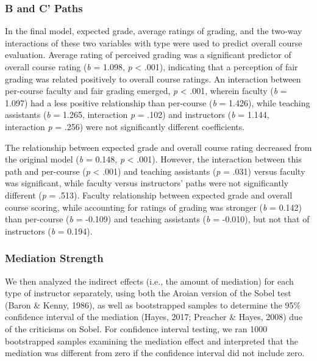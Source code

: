 \documentclass[,man]{apa6}
\theoremstyle{definition}
\theoremstyle{definition}
\theoremstyle{definition}
\theoremstyle{remark}
\begin{document}
\hypertarget{b-and-c-paths}{%
\subsubsection{B and C' Paths}\label{b-and-c-paths}}

In the final model, expected grade, average ratings of grading, and the
two-way interactions of these two variables with type were used to
predict overall course evaluation. Average rating of perceived grading
was a significant predictor of overall course rating (\emph{b} = 1.098,
\emph{p} \textless{} .001), indicating that a perception of fair grading
was related positively to overall course ratings. An interaction between
per-course faculty and fair grading emerged, \emph{p} \textless{} .001,
wherein faculty (\emph{b} = 1.097) had a less positive relationship than
per-course (\emph{b} = 1.426), while teaching assistants (\emph{b} =
1.265, interaction \emph{p} = .102) and instructors (\emph{b} = 1.144,
interaction \emph{p} = .256) were not significantly different
coefficients.

The relationship between expected grade and overall course rating
decreased from the original model (\emph{b} = 0.148, \emph{p}
\textless{} .001). However, the interaction between this path and
per-course (\emph{p} \textless{} .001) and teaching assistants (\emph{p}
= .031) versus faculty was significant, while faculty versus
instructors' paths were not significantly different (\emph{p} = .513).
Faculty relationship between expected grade and overall course scoring,
while accounting for ratings of grading was stronger (\emph{b} = 0.142)
than per-course (\emph{b} = -0.109) and teaching assistants (\emph{b} =
-0.010), but not that of instructors (\emph{b} = 0.194).

\hypertarget{mediation-strength}{%
\subsubsection{Mediation Strength}\label{mediation-strength}}

We then analyzed the indirect effects (i.e., the amount of mediation)
for each type of instructor separately, using both the Aroian version of
the Sobel test (Baron \& Kenny, 1986), as well as bootstrapped samples
to determine the 95\% confidence interval of the mediation (Hayes, 2017;
Preacher \& Hayes, 2008) due of the criticisms on Sobel. For confidence
interval testing, we ran 1000 bootstrapped samples examining the
mediation effect and interpreted that the mediation was different from
zero if the confidence interval did not include zero.
\end{document}
